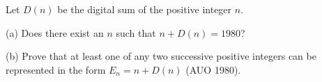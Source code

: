 Let $D(n)$ be the digital sum of the positive integer $n$.

(a) Does there exist an $n$ such that $n + D(n) = 1980$?

(b) Prove that at least one of any two successive positive integers can be represented in the form $E_n = n + D(n)$ (AUO 1980).
